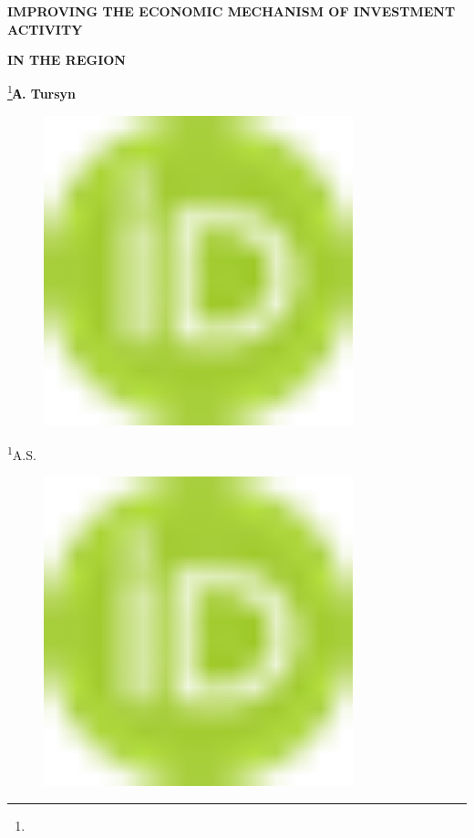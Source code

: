 
{\bfseries IMPROVING THE ECONOMIC MECHANISM OF INVESTMENT ACTIVITY}

{\bfseries IN THE REGION}

\footnote{}{\bfseries А. Tursyn\textsuperscript{\envelope }}
\begin{figure}[H]
	\centering
	\includegraphics[width=0.8\textwidth]{media/ekon/image1}
	\caption*{}
\end{figure}

\textsuperscript{1}A.S.
\begin{figure}[H]
	\centering
	\includegraphics[width=0.8\textwidth]{media/ekon/image1}
	\caption*{}
\end{figure}

